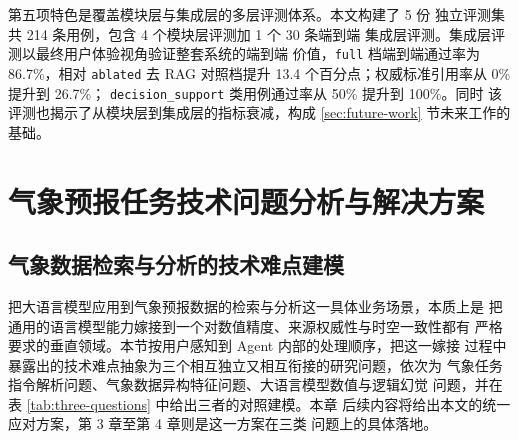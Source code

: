 \documentclass[a4paper]{article}
\newcommand{\song}{\CJKfamily{song}}
\newcommand{\xiaosihao}{\fontsize{12pt}{18pt}\selectfont}
\newcommand{\sectionbreak}{\clearpage} %
\newcommand\seccontent{
	\song
	\xiaosihao %
    \setlength{\parindent}{2em} %
    \setlength{\parskip}{0pt}
    }
\theoremstyle{definition}
\theoremstyle{plain}
\theoremstyle{remark}
\newcommand{\reftab}[1]{表 \ref{#1}}
\let\oldcite\cite
\renewcommand{\cite}[1]{\textsuperscript{\oldcite{#1}}}
\begin{document}
第五项特色是覆盖模块层与集成层的多层评测体系。本文构建了 5 份
独立评测集共 214 条用例，包含 4 个模块层评测加 1 个 30 条端到端
集成层评测。集成层评测以最终用户体验视角验证整套系统的端到端
价值，\texttt{full} 档端到端通过率为 86.7\%，相对 \texttt{ablated}
去 RAG 对照档提升 13.4 个百分点；权威标准引用率从 0\% 提升到 26.7\%；
\texttt{decision\_support} 类用例通过率从 50\% 提升到 100\%。同时
该评测也揭示了从模块层到集成层的指标衰减，构成 \ref{sec:future-work}
节未来工作的基础。



\sectionbreak
\seccontent
\section{气象预报任务技术问题分析与解决方案}
\label{chap:problem-modeling}


\subsection{气象数据检索与分析的技术难点建模}
\label{sec:problem-modeling}

把大语言模型应用到气象预报数据的检索与分析这一具体业务场景，本质上是
把通用的语言模型能力嫁接到一个对数值精度、来源权威性与时空一致性都有
严格要求的垂直领域。本节按用户感知到 Agent 内部的处理顺序，把这一嫁接
过程中暴露出的技术难点抽象为三个相互独立又相互衔接的研究问题，依次为
气象任务指令解析问题、气象数据异构特征问题、大语言模型数值与逻辑幻觉
问题，并在 \reftab{tab:three-questions} 中给出三者的对照建模。本章
后续内容将给出本文的统一应对方案，第 3 章至第 4 章则是这一方案在三类
问题上的具体落地。
\end{document}
